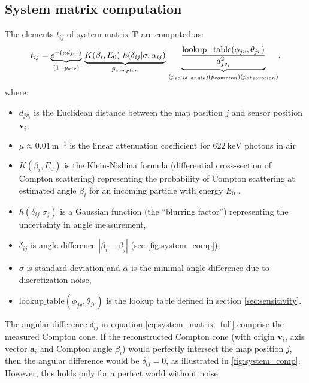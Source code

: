 \subsection{System matrix computation}
The elements $t_{ij}$ of system matrix $\mathbf{T}$ are computed as:
\begin{equation}
  t_{ij} = \underset{(1-p_{air})}{\underbrace{e^{-(\mu d_{jv_{i}})}}}\ 
  \underset{\bar{p}_{compton}} {  \underbrace{K(\beta_{i}, E_{0})\ h(\delta_{ij}|\sigma, \alpha_{ij})}} \
  \underset{(p_{solid\ angle})\\(p_{compton})\\(p_{absorption})} {\underbrace{\frac{\mathrm{lookup\_table}(\phi_{jv}, \theta_{jv})}{d_{jv_{i}}^{2}}}}
  ,%
  \label{eq:system_matrix_full}
\end{equation}
where:
\begin{itemize}
 \item $d_{jv_{i}}$ is the Euclidean distance between the map position $j$ and sensor position $\mathbf{v}_{i}$, 
 \item $\mu \approx \SI{0.01}{\meter^{-1}} $ is the linear attenuation coefficient for $\SI{622}{\kilo\electronvolt}$ photons in air
 \item $K(\beta_{i}, E_{0})$ is the Klein-Nishina formula (differential cross-section of Compton scattering) representing the probability of Compton scattering at estimated angle $\beta_{i}$ for an incoming particle with energy $E_{0}$ \cite{yuemeng_feng},
\item $h(\delta_{ij}|\sigma_{j})$ is a Gaussian function (the ``blurring factor'') representing the uncertainty in angle measurement,
\item $\delta_{ij}$ is angle difference $|\beta_{i}-\beta_{j}|$ (see \autoref{fig:system_comp}), 
\item $\sigma$ is standard deviation and $\alpha$ is the minimal angle difference due to discretization noise,
\item $\mathrm{lookup\_table}(\phi_{jv}, \theta_{jv})$ is the lookup table defined in section \autoref{sec:sensitivity}.
\end{itemize}

The angular difference $\delta_{ij}$ in equation \ref{eq:system_matrix_full} comprise the measured Compton cone.
If the reconstructed Compton cone (with origin $\mathbf{v}_{i}$, axis vector $\mathbf{a}_{i}$ and Compton angle $\beta_{i}$) would perfectly intersect the map position $j$, then the angular difference would be $\delta_{ij} = 0$, as illustrated in  \autoref{fig:system_comp}.
However, this holds only for a perfect world without noise.

